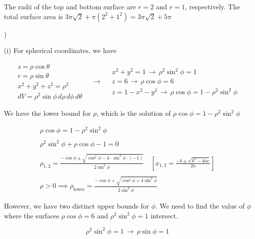 \documentclass{article}
\begin{document}
\hfill

\noindent The radii of the top and bottom surface are $r=2$ and $r=1$, respectively. The total surface area is $3\pi\sqrt2 + \pi\left(2^2+1^2\right)=\boxed{3\pi\sqrt2+5\pi}$

\hfill

)

\hfill

\noindent (i) For spherical coordinates, we have

\[
\begin{array}{c}
z=\rho\cos\theta\\
r=\rho\sin\theta\\
x^2+y^2+z^2=\rho^2\\
dV=\rho^2\sin\phi\,d\rho\,d\phi\,d\theta
\end{array}\quad\rightarrow\quad
\begin{array}{c}
x^2+y^2=1\,\rightarrow\,\rho^2\sin^2\phi = 1\\
z=6\,\rightarrow\,\rho\cos\phi=6\\
z=1-x^2-y^2\,\rightarrow\,\rho\cos\phi=1-\rho^2\sin^2\phi
\end{array}
\]

\hfill

\noindent We have the lower bound for $\rho$, which is the solution of $\rho\cos\phi=1-\rho^2\sin^2\phi$

\[
\begin{array}{c}
\rho\cos\phi=1-\rho^2\sin^2\phi\\\\
\rho^2\sin^2\phi+\rho\cos\phi-1=0\\\\
\displaystyle \rho_{1,2} = \frac{-\cos\phi \pm\sqrt{\cos^2\phi-4\cdot\sin^2\phi\cdot(-1)}}{2\sin^2\phi}\quad\left[x_{1,2}=\frac{-b\pm\sqrt{b^2-4ac}}{2a}\right]\\\\
\displaystyle \rho>0\implies\rho_{\text{lower}}=\frac{-\cos\phi +\sqrt{\cos^2\phi+4\sin^2\phi}}{2\sin^2\phi}
\end{array}
\]

\hfill

\noindent However, we have two distinct upper bounds for $\phi$. We need to find the value of $\phi$ where the surfaces $\rho\cos\phi = 6$ and $\rho^2\sin^2\phi=1$ intersect.

\begin{equation*}
\rho^2\sin^2\phi=1 \,\rightarrow\,\rho\sin\phi = 1
\end{equation*}
\end{document}
